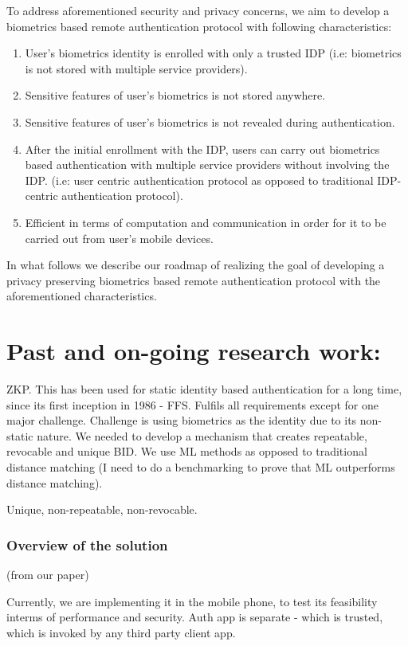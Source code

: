 \documentclass[10pt]{article}
\begin{document}
To address aforementioned security and privacy concerns, we aim to develop a biometrics based remote authentication protocol with following 
characteristics:
\begin{enumerate}
 \item User's biometrics identity is enrolled with only a trusted IDP (i.e: biometrics is not stored with multiple service providers).
 \item Sensitive features of user's biometrics is not stored anywhere.
 \item Sensitive features of user's biometrics is not revealed during authentication.
 \item After the initial enrollment with the IDP, users can carry out biometrics based authentication with multiple service providers without 
involving the IDP. (i.e: user centric authentication protocol as opposed to traditional IDP-centric authentication protocol).
 \item Efficient in terms of computation and communication in order for it to be carried out from user's mobile devices.
\end{enumerate}

In what follows we describe our roadmap of realizing the goal of developing a privacy preserving biometrics based remote authentication protocol with 
the aforementioned characteristics.

\section{Past and on-going research work:}
ZKP. This has been used for static identity based authentication for a long time, since its first inception in 1986 - FFS. 
Fulfils all requirements except for one major challenge.
Challenge is using biometrics as the identity due to its non-static nature. We needed to develop a mechanism that creates repeatable, revocable and 
unique BID. We use ML methods as opposed to traditional distance matching (I need to do a benchmarking to prove that ML outperforms distance 
matching).

Unique, non-repeatable, non-revocable.\\

\subsubsection*{Overview of the solution}
(from our paper)

Currently, we are implementing it in the mobile phone, to test its feasibility interms of performance and security.
Auth app is separate - which is trusted, which is invoked by any third party client app.
\end{document}

